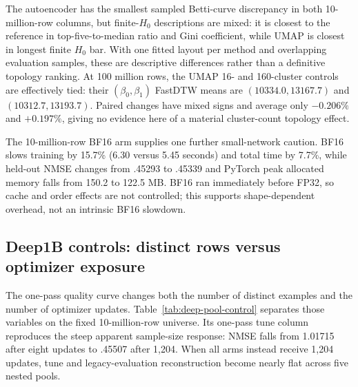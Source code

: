 \documentclass[10pt]{article}
\begin{document}
The autoencoder has the smallest sampled Betti-curve discrepancy in both 10-million-row
columns, but finite-$H_0$ descriptions are mixed: it is closest to the reference in
top-five-to-median ratio and Gini coefficient, while UMAP is closest in longest finite
$H_0$ bar.  With one fitted layout per method and overlapping evaluation samples, these
are descriptive differences rather than a definitive topology ranking.  At 100 million
rows, the UMAP 16- and 160-cluster controls are effectively tied: their
$(\beta_0,\beta_1)$ FastDTW means are $(10334.0,13167.7)$ and
$(10312.7,13193.7)$.  Paired changes have mixed signs and average only $-0.206\%$ and
$+0.197\%$, giving no evidence here of a material cluster-count topology effect.

The 10-million-row BF16 arm supplies one further small-network caution.  BF16 slows
training by 15.7\% (6.30 versus 5.45 seconds) and total time by 7.7\%, while held-out
NMSE changes from .45293 to .45339 and PyTorch peak allocated memory falls from 150.2
to 122.5 MB.  BF16 ran immediately before FP32, so cache and order effects are not
controlled; this supports shape-dependent overhead, not an intrinsic BF16 slowdown.

\subsection{Deep1B controls: distinct rows versus optimizer exposure}

The one-pass quality curve changes both the number of distinct examples and the number
of optimizer updates.  Table~\ref{tab:deep-pool-control} separates those variables on the
fixed 10-million-row universe.  Its one-pass tune column reproduces the steep apparent
sample-size response: NMSE falls from 1.01715 after eight updates to .45507 after 1,204.
When all arms instead receive 1,204 updates, tune and legacy-evaluation reconstruction
become nearly flat across five nested pools.
\end{document}
